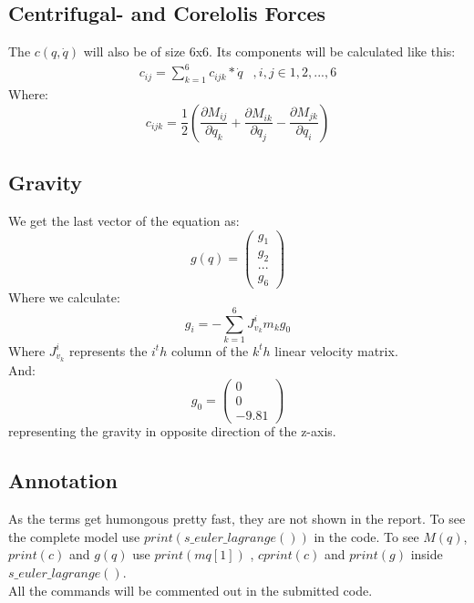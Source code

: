 \documentclass{article}
\begin{document}
\subsection{Centrifugal- and Corelolis Forces }
The $c(q,\dot{q})$ will also be of size 6x6. Its components will be calculated like this:
\begin{equation}
\begin{array}{ll}
		c_{ij} = \sum_{k=1}^6c_{ijk}*\dot{q}  &, i,j \in 1,2,...,6
\end{array}
\end{equation}
Where:
\begin{equation}
c_{ijk} = \frac{1}{2}(\frac{\partial M_{ij}}{\partial q_k}+\frac{\partial M_{ik}}{\partial q_j}-\frac{\partial M_{jk}}{\partial q_i})
\end{equation}
\subsection{Gravity}
We get the last vector of the equation as:
\begin{equation}
g(q) = \begin{pmatrix}
	g_1\\
	g_2\\
	...\\
	g_6
	\end{pmatrix}
\end{equation}
Where we calculate:
\begin{equation}
g_i = -\sum_{k=1}^6J_{v_k}^im_kg_0
\end{equation}
Where $J_{v_k}^i$ represents the $i^th$  column of the $k^th$ linear velocity matrix.\\
And:
\begin{equation}
g_0 = \begin{pmatrix}
		0\\
		0\\
		-9.81
	\end{pmatrix}
\end{equation}
representing the gravity in opposite direction of the z-axis.
\subsection{Annotation}
As the terms get humongous pretty fast, they are not shown in the report. To see the complete model use $print(s\_euler\_lagrange())$ in the code. To see $M(q)$, $print(c)$ and $g(q)$ use $print(mq[1])$ , $cprint(c)$ and $print(g)$ inside $s\_euler\_lagrange()$.\\ All the commands will be commented out in the submitted code.
\newpage
\end{document}
